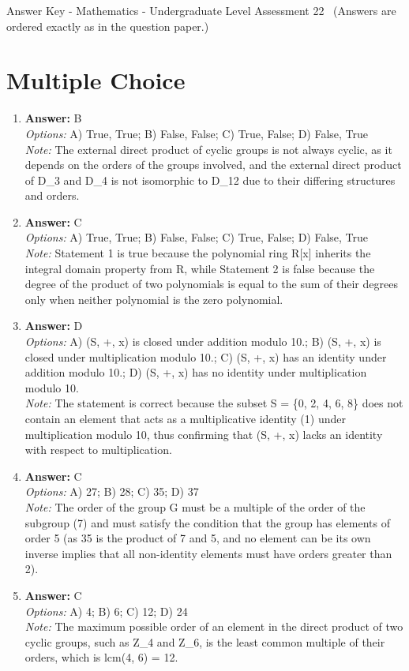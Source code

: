 \documentclass[12pt]{article}
\begin{document}
\begin{center}
Answer Key - Mathematics - Undergraduate Level Assessment 22 \
\small (Answers are ordered exactly as in the question paper.)
\end{center}

\section*{Multiple Choice}
\begin{enumerate}[label=\arabic*.]
\item \textbf{Answer:} B
\\ \textit{Options:} A) True, True; B) False, False; C) True, False; D) False, True
\\ \textit{Note:} The external direct product of cyclic groups is not always cyclic, as it depends on the orders of the groups involved, and the external direct product of D\_3 and D\_4 is not isomorphic to D\_12 due to their differing structures and orders.
\item \textbf{Answer:} C
\\ \textit{Options:} A) True, True; B) False, False; C) True, False; D) False, True
\\ \textit{Note:} Statement 1 is true because the polynomial ring R[x] inherits the integral domain property from R, while Statement 2 is false because the degree of the product of two polynomials is equal to the sum of their degrees only when neither polynomial is the zero polynomial.
\item \textbf{Answer:} D
\\ \textit{Options:} A) (S, +, x) is closed under addition modulo 10.; B) (S, +, x) is closed under multiplication modulo 10.; C) (S, +, x) has an identity under addition modulo 10.; D) (S, +, x) has no identity under multiplication modulo 10.
\\ \textit{Note:} The statement is correct because the subset S = \{0, 2, 4, 6, 8\} does not contain an element that acts as a multiplicative identity (1) under multiplication modulo 10, thus confirming that (S, +, x) lacks an identity with respect to multiplication.
\item \textbf{Answer:} C
\\ \textit{Options:} A) 27; B) 28; C) 35; D) 37
\\ \textit{Note:} The order of the group G must be a multiple of the order of the subgroup (7) and must satisfy the condition that the group has elements of order 5 (as 35 is the product of 7 and 5, and no element can be its own inverse implies that all non-identity elements must have orders greater than 2).
\item \textbf{Answer:} C
\\ \textit{Options:} A) 4; B) 6; C) 12; D) 24
\\ \textit{Note:} The maximum possible order of an element in the direct product of two cyclic groups, such as Z\_4 and Z\_6, is the least common multiple of their orders, which is lcm(4, 6) = 12.
\end{enumerate}
\end{document}

